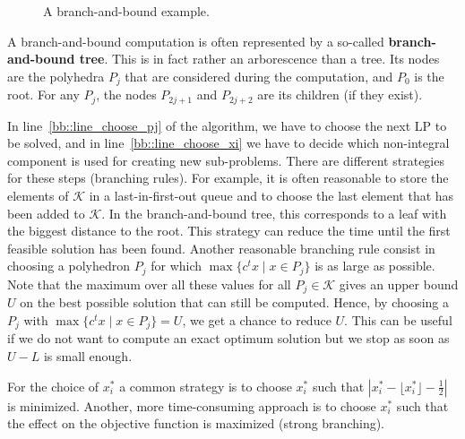 \documentclass[12pt, showidx, twoside]{article}
\def\hi{\bf}
\begin{document}
{{\begin{figure}[htb]
\begin{center}
\end{center}
\caption{\label{fig::ex_branch_bound}
A branch-and-bound example.}
\end{figure}





A branch-and-bound computation is often represented by a so-called 
{\hi branch-and-bound tree}.{} 
This is in fact rather an arborescence
than a tree. Its nodes are the polyhedra $P_j$ that are considered 
during the computation, and $P_0$ is the root. For any $P_j$, the 
nodes $P_{2j+1}$ and  $P_{2j+2}$ are its children (if they exist).



In line~\ref{bb::line_choose_pj} of the algorithm, we have to choose
the next LP to be solved, and in line~\ref{bb::line_choose_xi}
we have to decide which non-integral component is used for creating
new sub-problems.
There are different strategies for these
steps (branching rules).{} 
For example, it is often reasonable to store
the elements of $\mathcal{K}$ in a last-in-first-out queue and to
choose the last element that has been added to $\mathcal{K}$. In the
branch-and-bound tree, this corresponds to a leaf with the biggest
distance to the root. This strategy can reduce the time until the first
feasible solution has been found. Another reasonable branching rule
consist in choosing a polyhedron $P_j$ for which
$\max\{c^tx \mid x \in P_j\}$ is as large as possible. Note that
the maximum over all these values for all $P_j \in \mathcal{K}$
gives an upper bound $U$ on the best possible solution that can
still be computed. Hence, by choosing a $P_j$ with 
$\max\{c^tx \mid x \in P_j\} =U$, we get a chance to reduce $U$.
This can be useful if we do not want to compute an exact optimum
solution but we stop as soon as $U - L$ is small enough.

For the choice of $x^*_i$ a common strategy is to choose $x^*_i$
such that $|x^*_i - \lfloor x^*_i \rfloor -  \frac{1}{2}|$ is minimized.
Another, more time-consuming approach is to choose $x^*_i$ such that
the effect on the objective function is maximized (strong branching).



}}
\end{document}
